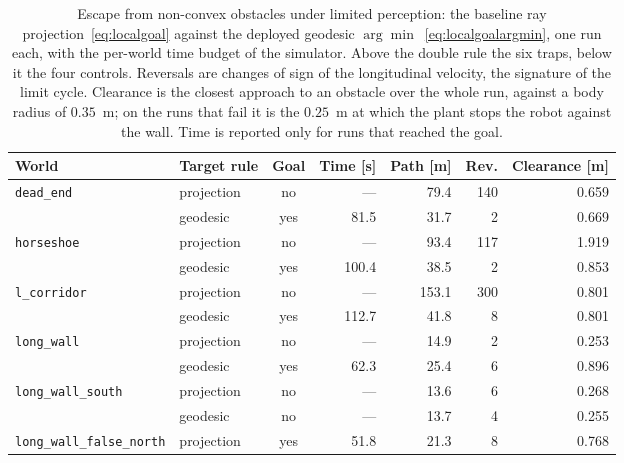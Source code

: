 \documentclass[11pt,a4paper]{article}
\begin{document}
\begin{table}[!ht]
  \centering
  \footnotesize
  \caption{Escape from non-convex obstacles under limited perception: the baseline ray
  projection~\eqref{eq:localgoal} against the deployed geodesic $\arg\min$~\eqref{eq:localgoalargmin}, one
  run each, with the per-world time budget of the simulator. Above the double rule the six traps, below it
  the four controls. Reversals are changes of sign of the longitudinal velocity, the signature of the limit
  cycle. Clearance is the closest approach to an obstacle over the whole run, against a body radius of
  $0.35$~m; on the runs that fail it is the $0.25$~m at which the plant stops the robot against the wall.
  Time is reported only for runs that reached the goal.}
  \label{tab:escape}
  \begin{tabular}{llcrrrr}
    \toprule
    World & Target rule & Goal & Time [s] & Path [m] & Rev. & Clearance [m] \\
    \midrule
    \texttt{dead\_end}                   & projection & no              &    --- &  79.4 &  140 & 0.659 \\
                                         & geodesic   & yes             &   81.5 &  31.7 &    2 & 0.669 \\
    \midrule
    \texttt{horseshoe}                   & projection & no              &    --- &  93.4 &  117 & 1.919 \\
                                         & geodesic   & yes             &  100.4 &  38.5 &    2 & 0.853 \\
    \midrule
    \texttt{l\_corridor}                 & projection & no              &    --- & 153.1 &  300 & 0.801 \\
                                         & geodesic   & yes             &  112.7 &  41.8 &    8 & 0.801 \\
    \midrule
    \texttt{long\_wall}                  & projection & no              &    --- &  14.9 &    2 & 0.253 \\
                                         & geodesic   & yes             &   62.3 &  25.4 &    6 & 0.896 \\
    \midrule
    \texttt{long\_wall\_south}           & projection & no              &    --- &  13.6 &    6 & 0.268 \\
                                         & geodesic   & no              &    --- &  13.7 &    4 & 0.255 \\
    \midrule
    \texttt{long\_wall\_false\_north}    & projection & yes             &   51.8 &  21.3 &    8 & 0.768 \\

\end{tabular}
\end{table}
\end{document}
